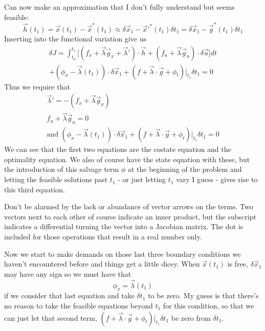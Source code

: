 \documentclass[11pt]{article}
\numberwithin{equation}{section}
\begin{document}
Can now make an approximation that I don't fully understand but seems feasible:
\begin{equation}
\vec{h}(t_1) = \vec{x}(t_1) - \vec{x}^*(t_1) \approx \delta\vec{x}_1 - \vec{x}'^*(t_1)\delta t_1 = \delta\vec{x}_1 - \vec{g}^*(t_1)\delta t_1
\end{equation}
Inserting into the functional variation give us
\begin{align}
\delta J = \int_{t_0}^{t_1}\big[(f_x + \vec{\lambda}\vec{g}_x + \vec{\lambda}')\cdot\vec{h} + (f_u + \vec{\lambda}\vec{g}_u)\cdot\delta\vec{u}\big]dt \\
+ (\phi_x - \vec{\lambda}(t_1))\cdot\delta\vec{x}_1 + (f + \vec{\lambda}\cdot\vec{g} + \phi_t)|_{t_1}\delta t_1 = 0
\end{align}
Thus we require that
\begin{align}
\vec{\lambda}' = -(f_x + \vec{\lambda}\vec{g}_x) \\
f_u + \vec{\lambda}\vec{g}_u = 0 \\
\text{and } (\phi_x - \vec{\lambda}(t_1))\cdot\delta\vec{x}_1 + (f + \vec{\lambda}\cdot\vec{g} + \phi_t)|_{t_1}\delta t_1 = 0
\end{align}
We can see that the first two equations are the costate equation and the optimality equation. We also of course have the state equation with these, but the introduction of this salvage term $\phi$ at the beginning of the problem and letting the feasible solutions past $t_1$ - or just letting $t_1$ vary I guess - gives rise to this third equation.

Don't be alarmed by the lack or abundance of vector arrows on the terms. Two vectors next to each other of course indicate an inner product, but the subscript indicates a differential turning the vector into a Jacobian matrix. The dot is included for those operations that result in a real number only.

Now we start to make demands on those last three boundary conditions we haven't encountered before and things get a little dicey. When $\vec{x}(t_1)$ is free, $\delta\vec{x}_1$ may have any sign so we must have that
\begin{equation}
\phi_x = \vec{\lambda}(t_1)
\end{equation}
if we consider that last equation and take $\delta t_1$ to be zero. My guess is that there's no reason to take the feasible equations beyond $t_1$ for this condition, so that we can just let that second term, $(f + \vec{\lambda}\cdot\vec{g} + \phi_t)|_{t_1}\delta t_1$ be zero from $\delta t_1$.
\end{document}
